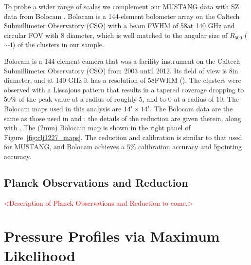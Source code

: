 \documentclass[iop,numberedappendix,apj]{emulateapj}
\begin{document}
To probe a wider range of scales we complement our MUSTANG data with SZ data from Bolocam \citep{glenn1998}. 
Bolocam is a 144-element bolometer
array on the Caltech Submillimeter Observatory (CSO) with a beam FWHM of 58\asecs at 140 GHz and circular FOV with 8\amins 
diameter, which is well matched to the angular size of $R_{500}$ ($\sim 4$\amin) of the clusters in our sample. 

Bolocam is a 144-element camera that was a facility instrument on the Caltech Submillimeter Observatory (CSO) from
2003 until 2012. Its field of view is 8\amins in diameter, and at 140 GHz it has a resolution of 58\asecs FWHM
(\citet{glenn1998,haig2004}). The clusters were observed with a Lissajous pattern that results in a tapered
coverage dropping to 50\% of the peak value at a radius of roughly 5\amin, and to 0 at a radius of 10\amin.
The Bolocam maps used in this analysis are $14\arcmin \times 14\arcmin$. The Bolocam data 
are the same as those used in \citet{czakon2015} and \citet{sayers2013}; the details of the reduction are 
given therein, along with \citet{sayers2011}. The (2mm) Bolocam map is shown in the right panel of Figure~\ref{fig:clj1227_maps}.
The reduction and calibration is similar to that used for MUSTANG, and Bolocam achieves a 
5\% calibration accuracy and 5\asecs pointing accuracy.


\subsection{Planck Observations and Reduction}

\textcolor{red}{<Description of Planck Observations and Reduction to come.>}

\section{Pressure Profiles via Maximum Likelihood}
\label{sec:ml_deproj}

\end{document}
